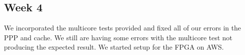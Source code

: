 \documentclass{article}
\begin{document}
\subsection{Week 4}
We incorporated the multicore tests provided and fixed all of our errors in the PPP and cache. We still are having some errors with the multicore test not producing the expected result. We started setup for the FPGA on AWS.
\end{document}
